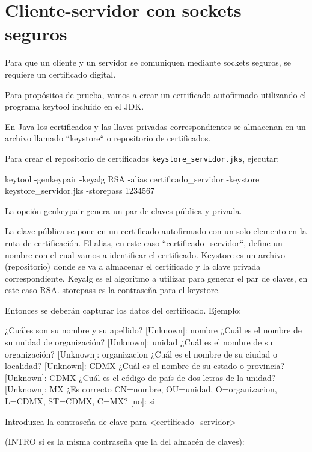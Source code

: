 \documentclass[11pt,a4paper,oneside]{book}
\begin{document}
\chapter{Cliente-servidor con sockets seguros}

Para que un cliente y un servidor se comuniquen mediante sockets seguros, se requiere un certificado digital.

Para propósitos de prueba, vamos a crear un certificado autofirmado utilizando el programa keytool incluido en el JDK.

En Java los certificados y las llaves privadas correspondientes se almacenan en un archivo llamado ``keystore`` o repositorio de certificados.

Para crear el repositorio de certificados \texttt{keystore\_servidor.jks}, ejecutar:

\begin{SourceCode}
keytool -genkeypair -keyalg RSA -alias certificado_servidor -keystore keystore_servidor.jks -storepass 1234567
\end{SourceCode}

La opción genkeypair genera un par de claves pública y privada.

La clave pública se pone en un certificado autofirmado con un solo elemento en la ruta de certificación. El alias, en este caso ``certificado\_servidor``, define un nombre con el cual vamos a identificar el certificado. Keystore es un archivo (repositorio) donde se va a almacenar el certificado y la clave privada correspondiente. Keyalg es el algoritmo a utilizar para generar el par de claves, en este caso RSA. storepass es la contraseña para el keystore.

Entonces se deberán capturar los datos del certificado. Ejemplo:

\begin{SourceCode}
¿Cuáles son su nombre y su apellido?
  [Unknown]:  nombre
¿Cuál es el nombre de su unidad de organización?
  [Unknown]:  unidad
¿Cuál es el nombre de su organización?
  [Unknown]:  organizacion
¿Cuál es el nombre de su ciudad o localidad?
  [Unknown]:  CDMX
¿Cuál es el nombre de su estado o provincia?
  [Unknown]:  CDMX
¿Cuál es el código de país de dos letras de la unidad?
  [Unknown]:  MX
¿Es correcto CN=nombre, OU=unidad, O=organizacion, L=CDMX, ST=CDMX, C=MX?
  [no]:  si

Introduzca la contraseña de clave para <certificado_servidor>

(INTRO si es la misma contraseña que la del almacén de claves):
\end{SourceCode}
\end{document}
